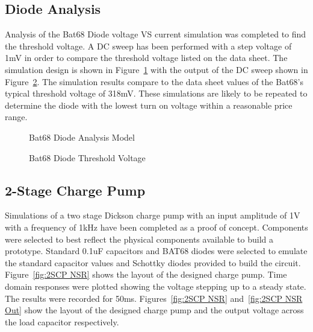 \documentclass[12pt]{article}
\begin{document}
	\subsection{Diode Analysis}
Analysis of the Bat68 Diode voltage VS current simulation was completed to find the threshold voltage. A DC sweep has been performed with a step voltage of 1mV in order to compare the threshold voltage listed on the data sheet. The simulation design is shown in Figure~\ref{fig:Bat68} with the output of the DC sweep shown in Figure~\ref{fig:Bat68sim}. The simulation results compare to the data sheet values of the Bat68's typical threshold voltage of 318mV. These simulations are likely to be repeated to determine the diode with the lowest turn on voltage within a reasonable price range.

\begin{figure}[H]
\caption{Bat68 Diode Analysis Model}
\label{fig:Bat68}
\end{figure}

\begin{figure}[H]
\caption{Bat68 Diode Threshold Voltage}
\label{fig:Bat68sim}
\end{figure}

	\subsection{2-Stage Charge Pump}

\noindent Simulations of a two stage Dickson charge pump with an input amplitude of 1V with a frequency of 1kHz have been completed as a proof of concept. Components were selected to best reflect the physical components available to build a prototype. Standard 0.1uF capacitors and BAT68 diodes were selected to emulate the standard capacitor values and Schottky diodes provided to build the circuit. Figure~\ref{fig:2SCP NSR} shows the layout of the designed charge pump. Time domain responses were plotted showing the voltage stepping up to a steady state. The results were recorded for 50ms. Figures~\ref{fig:2SCP NSR} and~\ref{fig:2SCP NSR Out} show the layout of the designed charge pump and the output voltage across the load capacitor respectively.
	
\end{document}
